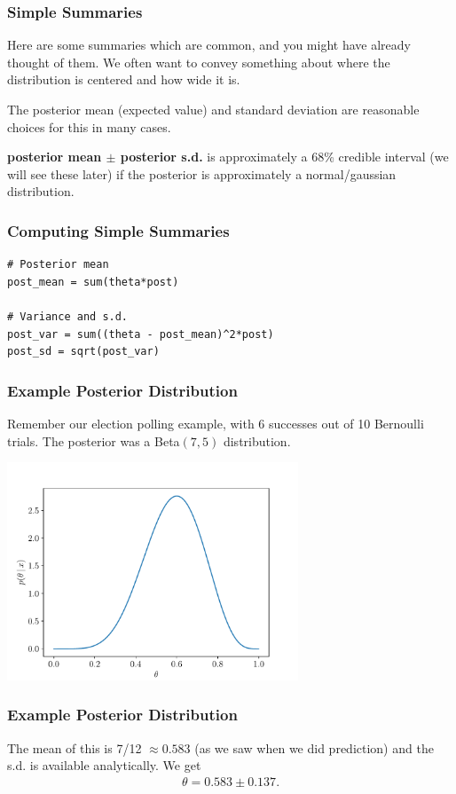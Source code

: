 \documentclass{beamer}
\begin{document}
\begin{frame}
\frametitle{Simple Summaries}
Here are some summaries which are common, and you might have already thought
of them. We often want to convey something about where the distribution is
centered and how wide it is.\pause

The posterior mean (expected value) and standard deviation are reasonable
choices for this in many cases.\pause

{\bf posterior mean $\pm$ posterior s.d.}
is approximately a 68\% credible interval
(we will see these later) if the posterior is approximately a normal/gaussian
distribution.

\end{frame}

\begin{frame}[fragile]
\frametitle{Computing Simple Summaries}
\begin{verbatim}
# Posterior mean
post_mean = sum(theta*post)

# Variance and s.d.
post_var = sum((theta - post_mean)^2*post)
post_sd = sqrt(post_var)
\end{verbatim}

\end{frame}


\begin{frame}[fragile]
\frametitle{Example Posterior Distribution}
Remember our election polling example, with 6 successes out of 10 Bernoulli
trials. The posterior was a Beta$(7, 5)$ distribution.

\begin{center}
\includegraphics[width=0.65\textwidth]{images/beta_posterior.pdf}
\end{center}

\end{frame}


\begin{frame}[fragile]
\frametitle{Example Posterior Distribution}

The mean of this is 7/12 $\approx 0.583$ (as we saw when we did prediction)
and the s.d. is available analytically. We get
\begin{align}
\theta = 0.583 \pm 0.137.
\end{align}


\end{frame}
\end{document}

